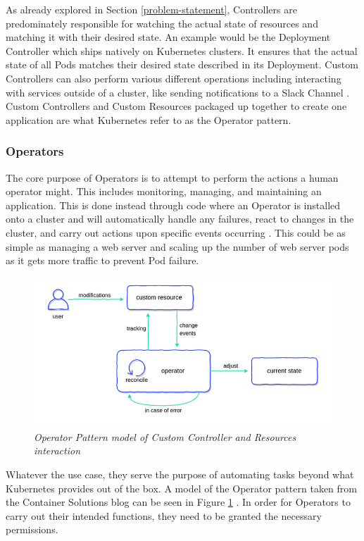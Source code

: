 \documentclass{article}
\begin{document}
As already explored in Section \ref{problem-statement}, Controllers are predominately responsible for watching the actual state of resources and matching it with their desired state. An example would be the Deployment Controller which ships natively on Kubernetes clusters. It ensures that the actual state of all Pods matches their desired state described in its Deployment. Custom Controllers can also perform various different operations including interacting with services outside of a cluster, like sending notifications to a Slack Channel \cite{ctrlrs-ref}. Custom Controllers and Custom Resources packaged up together to create one application are what Kubernetes refer to as the Operator pattern.


\subsubsection{Operators}

The core purpose of Operators is to attempt to perform the actions a human operator might. This includes monitoring, managing, and maintaining an application. This is done instead through code where an Operator is installed onto a cluster and will automatically handle any failures, react to changes in the cluster, and carry out actions upon specific events occurring \cite{operator-pattern}. This could be as simple as managing a web server and scaling up the number of web server pods as it gets more traffic to prevent Pod failure.
\begin{figure}[H]
    \centering
    \includegraphics[width=160mm]{tech/operator-pattern.png}
    \caption{\emph{Operator Pattern model of Custom Controller and Resources interaction}}
    \label{op-pat}
\end{figure}

Whatever the use case, they serve the purpose of automating tasks beyond what Kubernetes provides out of the box. A model of the Operator pattern taken from the Container Solutions blog can be seen in Figure \ref{op-pat} \cite{op-pat-blog}. In order for Operators to carry out their intended functions, they need to be granted the necessary permissions.
\end{document}

